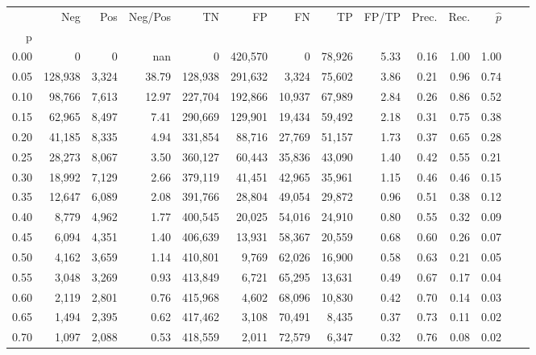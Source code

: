 \begin{tabular}{rrrrrrrrrrrrrr}
\toprule
{} &      Neg &    Pos & Neg/Pos &       TN &       FP &      FN &      TP & FP/TP & Prec. &  Rec. & $\hat{p}$ \\
p    &          &        &         &          &          &         &         &       &       &       &           \\
\midrule
0.00 &        0 &      0 &     nan &        0 &  420,570 &       0 &  78,926 &  5.33 &  0.16 &  1.00 &      1.00 \\
0.05 &  128,938 &  3,324 &   38.79 &  128,938 &  291,632 &   3,324 &  75,602 &  3.86 &  0.21 &  0.96 &      0.74 \\
0.10 &   98,766 &  7,613 &   12.97 &  227,704 &  192,866 &  10,937 &  67,989 &  2.84 &  0.26 &  0.86 &      0.52 \\
0.15 &   62,965 &  8,497 &    7.41 &  290,669 &  129,901 &  19,434 &  59,492 &  2.18 &  0.31 &  0.75 &      0.38 \\
0.20 &   41,185 &  8,335 &    4.94 &  331,854 &   88,716 &  27,769 &  51,157 &  1.73 &  0.37 &  0.65 &      0.28 \\
0.25 &   28,273 &  8,067 &    3.50 &  360,127 &   60,443 &  35,836 &  43,090 &  1.40 &  0.42 &  0.55 &      0.21 \\
0.30 &   18,992 &  7,129 &    2.66 &  379,119 &   41,451 &  42,965 &  35,961 &  1.15 &  0.46 &  0.46 &      0.15 \\
0.35 &   12,647 &  6,089 &    2.08 &  391,766 &   28,804 &  49,054 &  29,872 &  0.96 &  0.51 &  0.38 &      0.12 \\
0.40 &    8,779 &  4,962 &    1.77 &  400,545 &   20,025 &  54,016 &  24,910 &  0.80 &  0.55 &  0.32 &      0.09 \\
0.45 &    6,094 &  4,351 &    1.40 &  406,639 &   13,931 &  58,367 &  20,559 &  0.68 &  0.60 &  0.26 &      0.07 \\
0.50 &    4,162 &  3,659 &    1.14 &  410,801 &    9,769 &  62,026 &  16,900 &  0.58 &  0.63 &  0.21 &      0.05 \\
0.55 &    3,048 &  3,269 &    0.93 &  413,849 &    6,721 &  65,295 &  13,631 &  0.49 &  0.67 &  0.17 &      0.04 \\
0.60 &    2,119 &  2,801 &    0.76 &  415,968 &    4,602 &  68,096 &  10,830 &  0.42 &  0.70 &  0.14 &      0.03 \\
0.65 &    1,494 &  2,395 &    0.62 &  417,462 &    3,108 &  70,491 &   8,435 &  0.37 &  0.73 &  0.11 &      0.02 \\
0.70 &    1,097 &  2,088 &    0.53 &  418,559 &    2,011 &  72,579 &   6,347 &  0.32 &  0.76 &  0.08 &      0.02 \\

\end{tabular}
